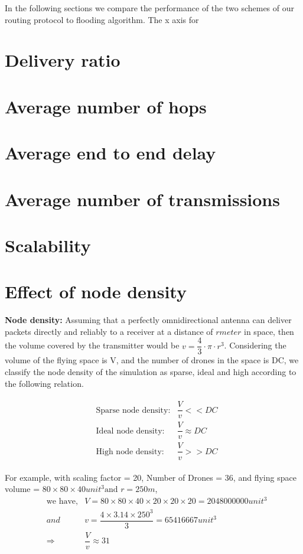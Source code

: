 In the following sections we compare the performance of the two schemes of our routing protocol to flooding algorithm. The x axis for 
\section{Delivery ratio}
\section{Average number of hops}
\section{Average end to end delay}
\section{Average number of transmissions}
\section{Scalability}
\section{Effect of node density}

\textbf{Node density:} Assuming that a perfectly omnidirectional antenna can deliver packets directly and reliably to a receiver at a distance of $ r meter$  in space, then the volume covered by the transmitter would be $ v = \dfrac{4}{3} \cdot \pi \cdot r^3 $. Considering the volume of the flying space is V, and the number of drones in the space is DC, we classify the node density of the simulation as sparse, ideal and high according to the following relation.

\begin{eqnarray} \label{node_density}
\begin{aligned}
& \text{Sparse node density:} & \dfrac{V}{v} << DC \\
& \text{Ideal node density:} & \dfrac{V}{v} \approx DC \\
& \text{High node density:} & \dfrac{V}{v} >> DC
\end{aligned}
\end{eqnarray}

For example, with scaling factor = 20, Number of Drones = 36, and flying space volume = $ 80 \times 80 \times 40 unit^3  \text{and } r = 250 m $,
\begin{eqnarray*}
& \text{we have,} & V = 80 \times 80 \times 40 \times 20 \times 20 \times 20 = 2048000000 unit^3 \\
& {and} & v = \dfrac{4 \times 3.14 \times 250 ^ 3}{3} = 65416667 unit ^ 3 \\
& \Rightarrow & \dfrac{V}{v} \approx 31
\end{eqnarray*}